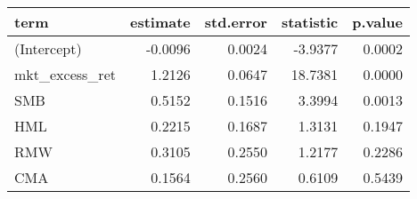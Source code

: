 \begin{table}[ht]
\centering
\begin{tabular}{lrrrr}
  \hline
term & estimate & std.error & statistic & p.value \\ 
  \hline
(Intercept) & -0.0096 & 0.0024 & -3.9377 & 0.0002 \\ 
  mkt\_excess\_ret & 1.2126 & 0.0647 & 18.7381 & 0.0000 \\ 
  SMB & 0.5152 & 0.1516 & 3.3994 & 0.0013 \\ 
  HML & 0.2215 & 0.1687 & 1.3131 & 0.1947 \\ 
  RMW & 0.3105 & 0.2550 & 1.2177 & 0.2286 \\ 
  CMA & 0.1564 & 0.2560 & 0.6109 & 0.5439 \\ 
   \hline
\end{tabular}
\end{table}

